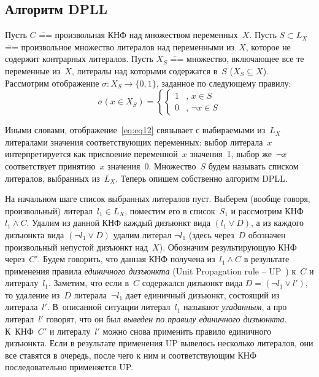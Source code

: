 \subsection{Алгоритм DPLL}

Пусть $C$ \=== произвольная КНФ над множеством переменных~$X$.
Пусть $S \subset L_{X}$ \=== произвольное множество литералов над переменными из~$X$, которое не содержит контрарных литералов.
Пусть $X_{S}$ \=== множество, включающее все те переменные из~$X$, литералы над которыми содержатся в~$S$ ($X_{S} \subseteq X$). Рассмотрим отображение $\sigma \colon X_{S} \to \{ 0,1 \}$, заданное по следующему правилу:
\begin{equation}\label{eq:eq12}
    \sigma(x \in X_{S}) = \left\{\begin{cases}
        1 &\text{, } x \in S \\
        0 &\text{, } \neg x \in S
    \end{cases} \right.
\end{equation}

Иными словами, отображение~\eqref{eq:eq12} связывает с выбираемыми из~$L_{X}$ литералами значения соответствующих переменных: выбор литерала~$x$ интерпретируется как присвоение переменной~$x$ значения~1, выбор же~$\neg x$ соответствует принятию~$x$ значения~0.
Множество~$S$ будем называть списком литералов, выбранных из~$L_{X}$.
Теперь опишем собственно алгоритм DPLL.

На начальном шаге список выбранных литералов пуст.
Выберем (вообще говоря, произвольный) литерал~$l_{1} \in L_{X}$, поместим его в список~$S_{1}$ и рассмотрим КНФ $l_{1} \land C$.
Удалим из данной КНФ каждый дизъюнкт вида $(l_{1} \lor D)$, а из каждого дизъюнкта вида $(\neg l_{1} \lor D)$ удалим литерал $\neg l_{1}$ (здесь через~$D$ обозначен произвольный непустой дизъюнкт над~$X$).
Обозначим результирующую КНФ через~$C'$.
Будем говорить, что данная КНФ получена из~$l_{1} \land C$ в результате применения правила \textit{единичного дизъюнкта} (Unit Propagation rule \--- UP~\cite{dowling1984}) к~$C$ и литералу~$l_{1}$.
Заметим, что если в~$C$ содержался дизъюнкт вида $D = (\neg l_{1} \lor l')$, то удаление из~$D$ литерала~$\neg l_{1}$ дает единичный дизъюнкт, состоящий из литерала~$l'$.
В~описанной ситуации литерал~$l_{1}$ называют \textit{угаданным}, а про литерал~$l'$ говорят, что он был \textit{выведен по правилу единичного дизъюнкта}.
К~КНФ~$C'$ и литералу~$l'$ можно снова применить правило единичного дизъюнкта.
Если в результате применения UP вывелось несколько литералов, они все ставятся в очередь, после чего к ним и соответствующим КНФ последовательно применяется UP.

